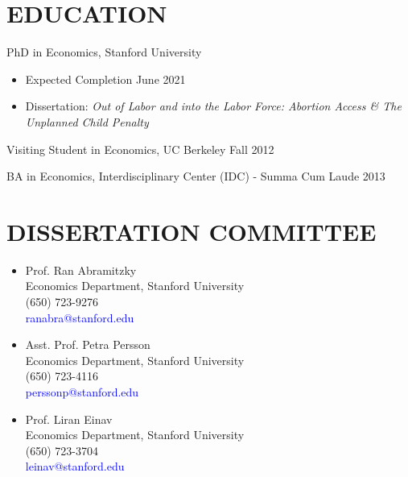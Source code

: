 \documentclass[margin]{res} %
\begin{document}
\begin{resume}



\section{EDUCATION}

PhD in Economics, Stanford University
\begin{itemize}
	\item Expected Completion  \hfill June 2021
	\item Dissertation: \textit{Out of Labor and into the Labor Force: Abortion Access \& The Unplanned Child Penalty}
\end{itemize}	

Visiting Student in Economics, UC Berkeley  \hfill Fall 2012 

BA in Economics, Interdisciplinary Center (IDC) - Summa Cum Laude \hfill 2013


\section{DISSERTATION COMMITTEE}


\begin{multicols}{2}
	\begin{itemize}
		 \item[] Prof. Ran Abramitzky \\
		Economics Department, Stanford University \\
		(650) 723-9276 \\
		\textcolor{blue}{ranabra@stanford.edu} \\

		 \item[] Asst. Prof. Petra Persson \\
		Economics Department, Stanford University \\
		(650) 723-4116 \\
		\textcolor{blue}{perssonp@stanford.edu} \\

		 \item[] Prof. Liran Einav\\
		Economics Department, Stanford University \\
		(650) 723-3704 \\
		\textcolor{blue}{leinav@stanford.edu} \\


\end{itemize}
\end{multicols}
\end{resume}
\end{document}
